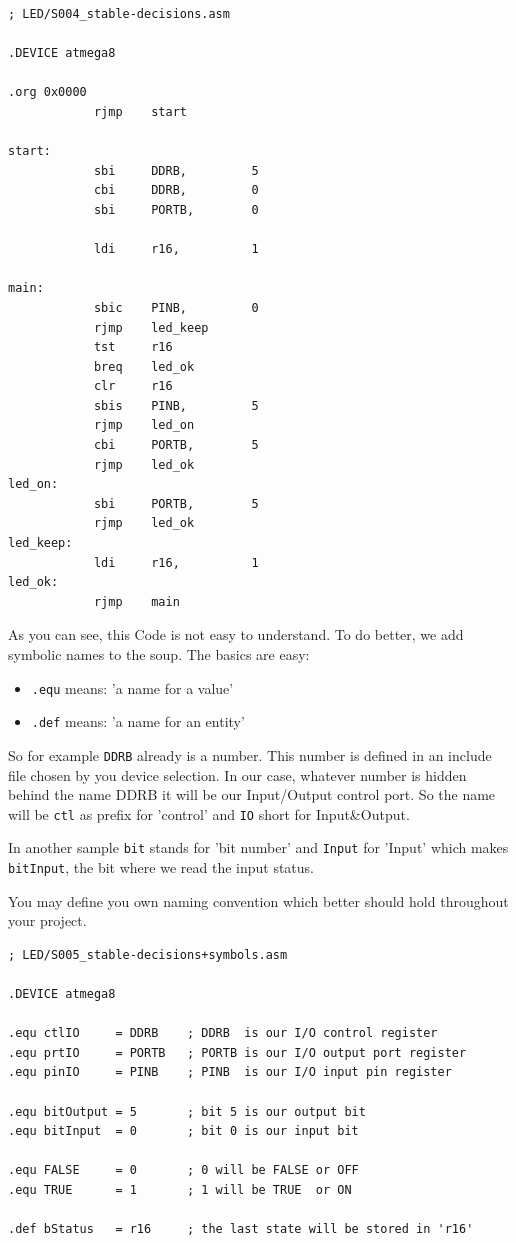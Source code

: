 \begin{lstlisting}
; LED/S004_stable-decisions.asm

.DEVICE atmega8

.org 0x0000
            rjmp    start

start:
            sbi     DDRB,         5
            cbi     DDRB,         0
            sbi     PORTB,        0

            ldi     r16,          1

main:
            sbic    PINB,         0
            rjmp    led_keep
            tst     r16
            breq    led_ok
            clr     r16
            sbis    PINB,         5
            rjmp    led_on
            cbi     PORTB,        5
            rjmp    led_ok
led_on:
            sbi     PORTB,        5
            rjmp    led_ok
led_keep:
            ldi     r16,          1
led_ok:
            rjmp    main
\end{lstlisting}


As you can see, this Code is not easy to understand. To do better, we add symbolic names to the soup. The basics are easy:

\begin{itemize}
  \item \texttt{.equ} means: 'a name for a value'
  \item \texttt{.def} means: 'a name for an entity'
\end{itemize}

So for example \texttt{DDRB} already is a number. This number is defined in an include file chosen by you device selection. In our case, whatever number is hidden behind the name DDRB it will be our Input/Output control port. So the name will be \texttt{ctl} as prefix for 'control' and \texttt{IO} short for Input\&Output.

In another sample \texttt{bit} stands for 'bit number' and \texttt{Input} for 'Input' which makes \texttt{bitInput}, the bit where we read the input status.

You may define you own naming convention which better should hold throughout your project.

\begin{lstlisting}
; LED/S005_stable-decisions+symbols.asm

.DEVICE atmega8

.equ ctlIO     = DDRB    ; DDRB  is our I/O control register
.equ prtIO     = PORTB   ; PORTB is our I/O output port register
.equ pinIO     = PINB    ; PINB  is our I/O input pin register

.equ bitOutput = 5       ; bit 5 is our output bit
.equ bitInput  = 0       ; bit 0 is our input bit

.equ FALSE     = 0       ; 0 will be FALSE or OFF
.equ TRUE      = 1       ; 1 will be TRUE  or ON

.def bStatus   = r16     ; the last state will be stored in 'r16'
\end{lstlisting}

